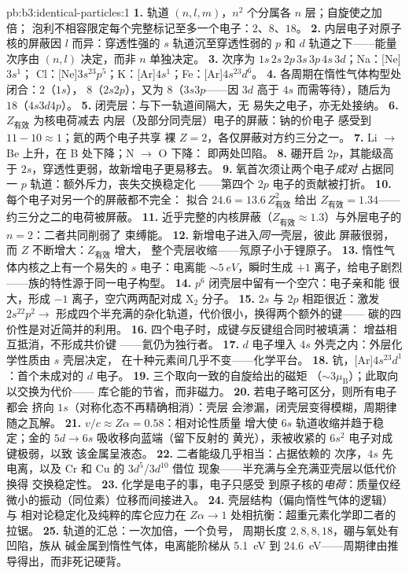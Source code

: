 \begin{solution}{pb:b3:identical-particles:1}
\textbf{1.} 轨道 $(n, l, m)$，$n^2$ 个分属各 $n$ 层；自旋使之加倍；
泡利不相容限定每个完整标记至多一个电子：$2$、$8$、$18$。
\textbf{2.} 内层电子对原子核的屏蔽因
$l$ 而异：穿透性强的 $s$ 轨道沉至穿透性弱的
$p$ 和 $d$ 轨道之下——能量次序由 $(n, l)$ 决定，而非 $n$
单独决定。
\textbf{3.} 次序为 $1s\,2s\,2p\,3s\,3p\,4s\,3d$；Na：[Ne]$3s^1$；
Cl：[Ne]$3s^23p^5$；K：[Ar]$4s^1$；Fe：[Ar]$4s^23d^6$。
\textbf{4.} 各周期在惰性气体构型处闭合：$2$（$1s$），
$8$（$2s2p$），又为 $8$（$3s3p$——因 $3d$ 高于 $4s$
而需等待），随后为 $18$（$4s3d4p$）。
\textbf{5.} 闭壳层：与下一轨道间隔大，无
易失之电子，亦无处接纳。
\textbf{6.} $Z_{\text{有效}}$ 为核电荷减去
内层（及部分同壳层）电子的屏蔽：钠的价电子
感受到 $11 - 10 \approx 1$；氦的两个电子共享
裸 $Z = 2$，各仅屏蔽对方约三分之一。
\textbf{7.} Li $\to$ Be 上升，在 B 处下降；N $\to$ O 下降：
即两处凹陷。
\textbf{8.} 硼开启 $2p$，其能级高于
$2s$，穿透性更弱，故新增电子更易移去。
\textbf{9.} 氧首次须让两个电子\emph{成对}
占据同一 $p$ 轨道：额外斥力，丧失交换稳定化
——第四个 $2p$ 电子的贡献被打折。
\textbf{10.} 每个电子对另一个的屏蔽都不完全：
拟合 $24.6 = 13.6\,Z_{\text{有效}}^2$ 给出 $Z_{\text{有效}} =
1.34$——约三分之二的电荷被屏蔽。
\textbf{11.} 近乎完整的内核屏蔽（$Z_{\text{有效}}
\approx 1.3$）与外层电子的 $n = 2$：二者共同削弱了
束缚能。
\textbf{12.} 新增电子进入\emph{同一}壳层，彼此
屏蔽很弱，而 $Z$ 不断增大：$Z_{\text{有效}}$ 增大，
整个壳层收缩——氖原子小于锂原子。
\textbf{13.} 惰性气体内核之上有一个易失的 $s$ 电子：电离能
$\sim\qty{5}{eV}$，瞬时生成 $+1$ 离子，给电子剧烈
——族的特性源于同一电子构型。
\textbf{14.} $p^6$ 闭壳层中留有一个空穴：电子亲和能
很大，形成 $-1$ 离子，空穴两两配对成 X$_2$ 分子。
\textbf{15.} $2s$ 与 $2p$ 相距很近：激发 $2s^22p^2 \to$
形成四个半充满的杂化轨道，代价很小，换得两个额外的键——
碳的四价性是对近简并的利用。
\textbf{16.} 四个电子时，成键\emph{与}反键组合同时被填满：
增益相互抵消，不形成共价键
——氦仍为独行者。
\textbf{17.} $d$ 电子埋入 $4s$
外壳之内：外层化学性质由 $s$ 壳层决定，
在十种元素间几乎不变——化学平台。
\textbf{18.} 钪，[Ar]$4s^23d^1$：首个未成对的 $d$
电子。
\textbf{19.} 三个取向一致的自旋给出的磁矩
（$\sim3\mu_{\text{B}}$）；此取向以交换为代价——
库仑能的节省，而非磁力。
\textbf{20.} 若电子略可区分，则所有电子都会
挤向 $1s$（对称化态不再精确相消）：壳层
会渗漏，闭壳层变得模糊，周期律随之瓦解。
\textbf{21.} $v/c \approx Z\alpha = 0.58$：相对论性质量
增大使 $6s$ 轨道收缩并趋于稳定；金的
$5d \to 6s$ 吸收移向蓝端（留下反射的
黄光），汞被收紧的 $6s^2$ 电子对成键极弱，以致
该金属呈液态。
\textbf{22.} 二者能级几乎相当：占据依赖的
次序，$4s$ 先电离，以及 Cr 和 Cu 的 $3d^5$/$3d^{10}$ 借位
现象——半充满与全充满亚壳层以低代价换得
交换稳定性。
\textbf{23.} 化学是电子的事，电子只感受
到原子核的\emph{电荷}：质量仅经
微小的振动（同位素）位移而间接进入。
\textbf{24.} 壳层结构（偏向惰性气体的逻辑）与
相对论稳定化及纯粹的库仑应力在
$Z\alpha \to 1$ 处相抗衡：超重元素化学即二者的拉锯。
\textbf{25.} 轨道的汇总：一次加倍，一个负号，
周期长度 $2, 8, 8, 18$，硼与氧处有凹陷，族从
碱金属到惰性气体，电离能阶梯从 \qty{5.1}{eV} 到
\qty{24.6}{eV}——周期律由推导得出，而非死记硬背。
\end{solution}
